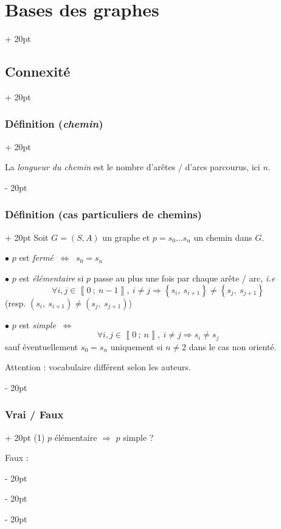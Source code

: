 \documentclass[a4paper, 12pt, twoside]{article}
\newcommand{\nset}[2]{\left\llbracket #1\ ;\ #2 \right\rrbracket}
\newcommand{\set}[1]{\left\{ #1 \right\}}
\newcommand{\ssi}{\ \Leftrightarrow \ }
\newcommand{\ind}[1][20pt]{\advance\leftskip + #1}
\newcommand{\deind}[1][20pt]{\advance\leftskip - #1}
\newenvironment{indt}[2][20pt]{#2 \par \ind[#1]}{\par \deind} %
\begin{document}
\begin{indt}{\section{Bases des graphes}}
\begin{indt}{\subsection{Connexité}}
\begin{indt}{\subsubsection{Définition (\textit{chemin})}}
                \vspace{12pt}
                
                La \textit{longueur du chemin} est le nombre d'arêtes / d'arcs parcourus, ici $n$.
            \end{indt}

            \vspace{12pt}
            
            \begin{indt}{\subsubsection{Définition (cas particuliers de chemins)}}
                Soit $G = (S, A)$ un graphe et $p = s_0 \ldots s_n$ un chemin dans $G$.

                $\bullet$ $p$ est \textit{fermé} $\ssi$ $s_0 = s_n$

                $\bullet$ $p$ est \textit{élémentaire} si $p$ passe au plus une fois par chaque arête / arc, \textit{i.e}
                \[
                    \forall i, j \in \nset{0}{n - 1},\ i \neq j \Rightarrow \set{s_i,\ s_{i + 1}} \neq \set{s_j,\ s_{j + 1}}
                \]
                (resp. $(s_i,\ s_{i + 1}) \neq (s_j,\ s_{j + 1})$)

                \vspace{12pt}
                
                $\bullet$ $p$ est \textit{simple} $\ssi$
                \[
                    \forall i, j \in \nset{0}{n},\ i \neq j \Rightarrow s_i \neq s_j
                \]
                sauf éventuellement $s_0 = s_n$ uniquement si $n \neq 2$ dans le cas non orienté.
                \vspace{12pt}
                
                Attention : vocabulaire différent selon les auteurs.
            \end{indt}

            \vspace{12pt}
            
            \begin{indt}{\subsubsection{Vrai / Faux}}
                (1) $p$ élémentaire $\Rightarrow$ $p$ simple ?

                Faux :


\end{indt}
\end{indt}
\end{indt}
\end{document}
